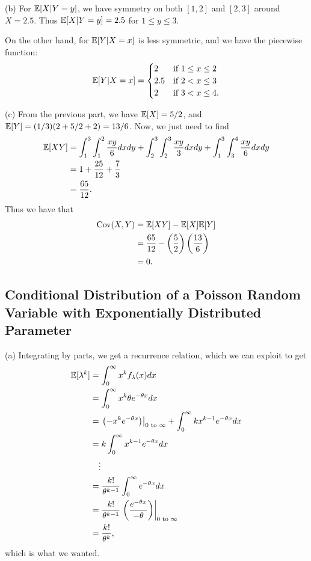 (b) For $\mathbb{E}[X|Y = y]$, we have symmetry on both $[1, 2]$ and $[2, 3]$ around $X = 2.5$. Thus $\mathbb{E}[X|Y = y] = 2.5$ for $1 \leq y \leq 3$.

On the other hand, for $\mathbb{E}[Y|X = x]$ is less symmetric, and we have the piecewise function:
\[
\mathbb{E}[Y|X = x] = 
\begin{cases}
    2 &\text{if } 1 \leq x \leq 2 \\
    2.5 &\text{if } 2 < x \leq 3 \\
    2 &\text{if } 3 < x \leq 4.
\end{cases}
\]

(c) From the previous part, we have $\mathbb{E}[X] = 5/2$, and $\mathbb{E}[Y] = (1/3)(2 + 5/2 + 2) = 13/6$. Now, we just need to find
\begin{align*}
    \mathbb{E}[XY] &= \int_1^3\int_1^2 \frac{xy}{6} dxdy + \int_2^3\int_2^3 \frac{xy}{3}dxdy + \int_1^3\int_3^4 \frac{xy}{6}dxdy \\
    &= 1 + \frac{25}{12} + \frac{7}{3} \\
    &= \frac{65}{12}.
\end{align*}
Thus we have that
\begin{align*}
\text{Cov}(X, Y) &= \mathbb{E}[XY] - \mathbb{E}[X]\mathbb{E}[Y] \\
&= \frac{65}{12} - \left(\frac{5}{2}\right)\left(\frac{13}{6}\right) \\
&= 0.
\end{align*}

\subsection{Conditional Distribution of a Poisson Random Variable with Exponentially Distributed Parameter}

(a) Integrating by parts, we get a recurrence relation, which we can exploit to get
\begin{align*}
    \mathbb{E}[\lambda^k] &= \int_0^\infty x^k f_\lambda(x) dx \\
    &= \int_0^\infty x^k\theta e^{-\theta x} dx \\
    &= \left.\left(-x^k e^{-\theta x}\right)\right|_{0 \text{ to } \infty} + \int_0^\infty kx^{k-1}e^{-\theta x} dx \\
    &= k\int_0^\infty x^{k-1}e^{-\theta x} dx \\
    &\quad\vdots \\
    &= \frac{k!}{\theta^{k-1}}\int_0^\infty e^{-\theta x} dx \\
    &= \frac{k!}{\theta^{k-1}}\left.\left(\frac{e^{-\theta x}}{-\theta}\right)\right|_{0 \text{ to } \infty} \\
    &= \frac{k!}{\theta^k},
\end{align*}
which is what we wanted.

